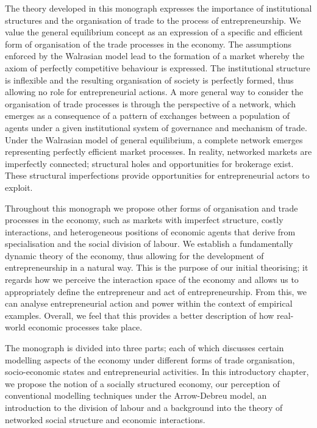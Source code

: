 The theory developed in this monograph expresses the importance of institutional structures and the organisation of trade to the process of entrepreneurship. We value the general equilibrium concept as an expression of a specific and efficient form of organisation of the trade processes in the economy. The assumptions enforced by the Walrasian model lead to the formation of a market whereby the axiom of perfectly competitive behaviour is expressed. The institutional structure is inflexible and the resulting organisation of society is perfectly formed, thus allowing no role for entrepreneurial actions. A more general way to consider the organisation of trade processes is through the perspective of a network, which emerges as a consequence of a pattern of exchanges between a population of agents under a given institutional system of governance and mechanism of trade. Under the Walrasian model of general equilibrium, a complete network emerges representing perfectly efficient market processes. In reality, networked markets are imperfectly connected; structural holes and opportunities for brokerage exist. These structural imperfections provide opportunities for entrepreneurial actors to exploit.

Throughout this monograph we propose other forms of organisation and trade processes in the economy, such as markets with imperfect structure, costly interactions, and heterogeneous positions of economic agents that derive from specialisation and the social division of labour. We establish a fundamentally dynamic theory of the economy, thus allowing for the development of entrepreneurship in a natural way. This is the purpose of our initial theorising; it regards how we perceive the interaction space of the economy and allows us to appropriately define the entrepreneur and act of entrepreneurship. From this, we can analyse entrepreneurial action and power within the context of empirical examples. Overall, we feel that this provides a better description of how real-world economic processes take place. 

The monograph is divided into three parts; each of which discusses certain modelling aspects of the economy under different forms of trade organisation, socio-economic states and entrepreneurial activities. In this introductory chapter, we propose the notion of a socially structured economy, our perception of conventional modelling techniques under the Arrow-Debreu model, an introduction to the division of labour and a background into the theory of networked social structure and economic interactions.

